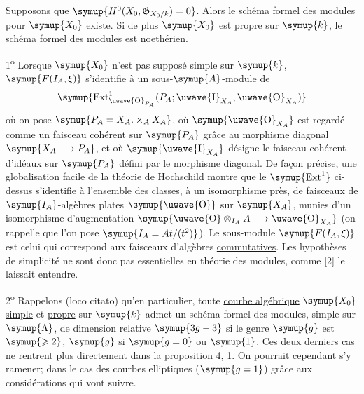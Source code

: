  Supposons que
$\symup{H^0(X_0,\mathfrak G_{X_0/k})=0}$. Alors le schéma formel des modules pour $\symup{X_0}$
existe. Si de plus $\symup{X_0}$ est propre sur $\symup{k}$, le schéma formel des modules est
noethérien.


1\textsuperscript{o} Lorsque $\symup{X_0}$ n'est pas supposé
simple sur $\symup{k}$, $\symup{F(I_A,\xi)}$ s'identifie à un sous-$\symup{A}$-module de
\[
  \symup{\operatorname{Ext}^1_{\text{\uwave{O}}_{P_A}}(P_A;\text{\uwave{I}}_{X_A},\text{\uwave{O}}_{X_A})}
\]
où on pose $\symup{P_A=X_A.\times_A X_A}$, où $\symup{\text{\uwave{O}}_{X_A}}$ est regardé
comme un faisceau cohérent sur $\symup{P_A}$ grâce au morphisme diagonal
$\symup{X_A\longrightarrow P_A}$, et où $\symup{\text{\uwave{I}}_{X_A}}$ désigne le faisceau
cohérent d'idéaux sur $\symup{P_A}$ défini par le morphisme diagonal. De façon précise,
une globalisation facile de la théorie de Hochschild montre que le
$\symup{\operatorname{Ext}^1}$ ci-dessus s'identifie à l'ensemble des classes, à un
isomorphisme près, de faisceaux de $\symup{I_A}$-algèbres plates $\symup{\text{\uwave{O}}}$ sur
$\symup{X_A}$, munies d'un isomorphisme d'augmentation $\symup{\text{\uwave{O}}\otimes_{I_A}A\longrightarrow\text{\uwave{O}}_{X_A}}$ (on rappelle que l'on pose $\symup{I_A=At/(t^2)}$). Le sous-module $\symup{F(I_A,\xi)}$ est
celui qui correspond aux faisceaux d'algèbres \uline{commutatives}. Les hypothèses de
simplicité ne sont donc pas essentielles en théorie des modules, comme [2] le
laissait entendre.

2\textsuperscript{o} Rappelons (loco citato) qu'en particulier, toute \uline{courbe
algébrique} $\symup{X_0}$ \uline{simple} et \uline{propre} sur $\symup{k}$ admet un schéma formel des modules,
simple sur $\symup{\Lambda}$, de dimension relative $\symup{3g-3}$ si le genre $\symup{g}$ est
$\symup{\geqslant2}$, $\symup{g}$ si $\symup{g=0}$ ou $\symup{1}$. Ces deux derniers cas ne rentrent plus
directement dans la proposition 4, 1. On pourrait cependant s'y ramener; dans
le cas des courbes elliptiques ($\symup{g=1}$) grâce aux considérations qui vont
suivre.

